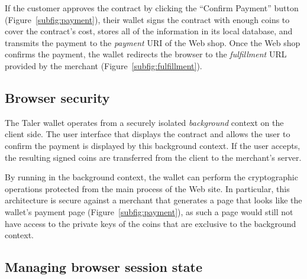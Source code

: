 \documentclass{llncs}
\begin{document}
If the customer approves the contract by clicking the ``Confirm
Payment'' button (Figure~\ref{subfig:payment}), their wallet signs the
contract with enough coins to cover the contract's cost, stores all of
the information in its local database, and transmits the payment to
the {\em payment} URI of the Web shop.  Once the Web shop confirms the
payment, the wallet redirects the browser to the {\em fulfillment} URL
provided by the merchant (Figure~\ref{subfig:fulfillment}).

\subsection{Browser security}

The Taler wallet operates from a securely isolated {\em background}
context on the client side.  The user interface that displays the
contract and allows the user to confirm the payment is displayed by
this background context.  If the user accepts, the resulting signed
coins are transferred from the client to the merchant's server.

By running in the background context, the wallet can perform the
cryptographic operations protected from the main process of the Web
site.  In particular, this architecture is secure against a merchant
that generates a page that looks like the wallet's payment page
(Figure~\ref{subfig:payment}), as such a page would still not have
access to the private keys of the coins that are exclusive to the
background context.


\subsection{Managing browser session state}





\end{document}
